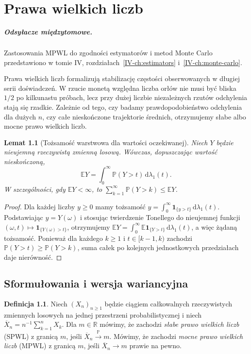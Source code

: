 \documentclass[11pt,a4paper,oneside]{report}
\numberwithin{equation}{chapter}
\theoremstyle{plain}
\newtheorem{lemat}[twierdzenie]{Lemat}
\theoremstyle{definition}
\newtheorem{definicja}{Definicja}[chapter]
\theoremstyle{remark}
\newcommand{\R}{\mathbb{R}}
\newcommand{\Prob}{\mathbb{P}}
\newcommand{\E}{\mathbb{E}}
\newcommand{\ind}[1]{\mathbf{1}_{#1}}
\newcommand{\dd}{\mathrm{d}}
\begin{document}

\chapter{Prawa wielkich liczb}
\label{ch:lln}
\paragraph{Odsyłacze międzytomowe.} Zastosowania MPWL do zgodności estymatorów i metod Monte Carlo przedstawiono w tomie IV, rozdziałach~\ref{IV-ch:estimators} i~\ref{IV-ch:monte-carlo}.


Prawa wielkich liczb formalizują stabilizację częstości
obserwowanych w długiej serii doświadczeń. W rzucie monetą
względna liczba orłów nie musi być bliska $1/2$ po
kilkunastu próbach, lecz przy dużej liczbie niezależnych
rzutów odchylenia stają się rzadkie. Zależnie od tego,
czy badamy prawdopodobieństwo odchylenia dla dużych $n$,
czy całe nieskończone trajektorie średnich, otrzymujemy
słabe albo mocne prawo wielkich liczb.

\begin{lemat}[Tożsamość warstwowa dla wartości oczekiwanej]
Niech $Y$ będzie nieujemną rzeczywistą zmienną losową.
Wówczas, dopuszczając wartość nieskończoną,
\[
\E Y=\int_0^\infty \Prob(Y>t)\,\dd\lambda_1(t).
\]
W szczególności, gdy $\E Y<\infty$, to
$\sum_{k=1}^\infty\Prob(Y>k)\leq\E Y$.
\end{lemat}
\begin{proof}
Dla każdej liczby $y\geq0$ mamy tożsamość
$y=\int_0^\infty\ind{\{y>t\}}\,\dd\lambda_1(t)$.
Podstawiając $y=Y(\omega)$ i stosując twierdzenie
Tonellego do nieujemnej funkcji
$(\omega,t)\mapsto\ind{\{Y(\omega)>t\}}$,
otrzymujemy
$\E Y=\int_0^\infty \E\ind{\{Y>t\}}\,\dd\lambda_1(t)$,
a więc żądaną tożsamość. Ponieważ dla każdego $k\geq1$
i $t\in[k-1,k)$ zachodzi
$\Prob(Y>t)\geq\Prob(Y>k)$, suma całek po
kolejnych jednostkowych przedziałach daje nierówność.
\end{proof}

\section{Sformułowania i wersja wariancyjna}

\begin{definicja}
Niech $(X_n)_{n\geq1}$ będzie ciągiem całkowalnych
rzeczywistych zmiennych losowych na jednej przestrzeni
probabilistycznej i niech
$\overline X_n=n^{-1}\sum_{k=1}^nX_k$.
Dla $m\in\R$ mówimy, że zachodzi \emph{słabe prawo
wielkich liczb} (SPWL) z granicą $m$, jeśli
$\overline X_n\xrightarrow{\Prob}m$.
Mówimy, że zachodzi \emph{mocne prawo wielkich liczb}
(MPWL) z granicą $m$, jeśli
$\overline X_n\to m$ prawie na pewno.
\end{definicja}
\end{document}
